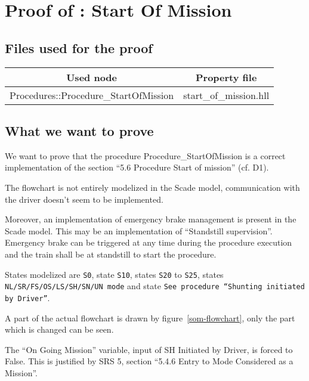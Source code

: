 \section{Proof of : Start Of Mission}
\subsection{Files used for the proof}
\begin{tabular}{|c|c|}
\hline
Used node & Property file \\ \hline
Procedures::Procedure\_StartOfMission & start\_of\_mission.hll \\
\hline
\end{tabular}

\subsection{What we want to prove}
We want to prove that the procedure Procedure\_StartOfMission is a
correct implementation of the section ``5.6 Procedure Start of
mission'' (cf. D1).

The flowchart is not entirely modelized in the Scade model,
communication with the driver doesn't seem to be implemented.

Moreover, an implementation of emergency brake management is present in
the Scade model. This may be an implementation of ``Standstill
supervision''. Emergency brake can be triggered at any time during the
procedure execution and the train shall be at standstill to start the
procedure.

States modelized are \texttt{S0}, state \texttt{S10}, states
\texttt{S20} to \texttt{S25}, states \texttt{NL/SR/FS/OS/LS/SH/SN/UN
  mode} and state \texttt{See procedure ``Shunting initiated by
  Driver''}. 

A part of the actual flowchart is drawn by figure~\ref{som-flowchart},
only the part which is changed can be seen.

The ``On Going Mission'' variable, input of SH Initiated by Driver, is
forced to False. This is justified by SRS 5, section ``5.4.6 Entry to
Mode Considered as a Mission''.

